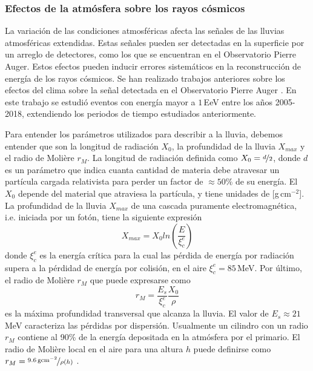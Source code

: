 \subsubsection{Efectos de la atmósfera sobre los rayos cósmicos}

La variación de las condiciones atmosféricas afecta las señales de las lluvias atmosféricas extendidas. Estas señales pueden ser detectadas en la superficie por un arreglo de detectores, como los que se encuentran en el Observatorio Pierre Auger. Estos efectos pueden inducir errores sistemáticos en la reconstrucción de energía de los rayos cósmicos. Se han realizado  trabajos anteriores sobre los efectos del clima sobre la señal detectada en el Observatorio Pierre Auger \cite{collaboration2009atmospheric} \cite{aab2017impact}. En este trabajo se estudió eventos con energía mayor a $1\,$EeV entre los años 2005-2018, extendiendo los periodos de tiempo estudiados anteriormente.

Para entender los parámetros utilizados para describir a la lluvia, debemos entender que son la longitud de radiación $X_0$, la profundidad de la lluvia $X_{max}$ y el radio de Molière $r_M$. La longitud de radiación definida como $X_0=\nicefrac{d}{2}$,  donde $d$ es un parámetro que indica cuanta cantidad de materia debe atravesar un partícula cargada relativista para perder un factor de $\approx 50\%$ de su  energía. El $X_0$ depende del material que atraviesa la partícula, y tiene unidades de [g\,cm$^{-2}$]. La profundidad de la lluvia $X_{max}$ de una cascada puramente electromagnética, i.e. iniciada por un fotón, tiene la siguiente expresión \cite{matthews2005heitler}
\begin{equation}
 	X_{max} = X_0{ln(\frac{E}{\xi^e_c})}
 \end{equation} 
donde  $\xi^e_c$ es la energía crítica para la cual las pérdida de energía por radiación supera a la pérdidad de energía por colisión, en el aire $\xi^e_c=85\,$MeV. Por último, el radio de Molière $r_M$ que puede expresarse como 
\begin{equation}
	r_M= \frac{E_s}{\xi^e_c}\frac{X_0}{\rho}
\end{equation}
es la máxima profundidad transversal que alcanza la lluvia. El valor de $E_s\approx21\,$MeV caracteriza las pérdidas por dispersión. Usualmente un cilindro con un radio $r_M$ contiene al 90\% de la energía depositada en la atmósfera por el primario. El radio de Molière local en el aire para una altura $h$ puede definirse como $r_M = \nicefrac{9.6\,\text{gcm}^{-2}}{\rho(h)}$ \cite{gora2006universal}. 

